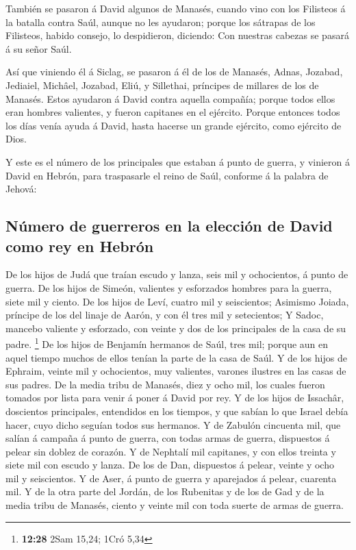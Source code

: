  También se pasaron á David algunos de Manasés, cuando vino
con los Filisteos á la batalla contra Saúl, aunque no les ayudaron;
porque los sátrapas de los Filisteos, habido consejo, lo despidieron,
diciendo: Con nuestras cabezas se pasará á su señor Saúl.

 Así que viniendo él á Siclag, se pasaron á él de los de
Manasés, Adnas, Jozabad, Jediaiel, Michâel, Jozabad, Eliú, y Sillethai,
príncipes de millares de los de Manasés.  Estos ayudaron á
David contra aquella compañía; porque todos ellos eran hombres
valientes, y fueron capitanes en el ejército.  Porque
entonces todos los días venía ayuda á David, hasta hacerse un grande
ejército, como ejército de Dios.

 Y este es el número de los principales que estaban á punto
de guerra, y vinieron á David en Hebrón, para traspasarle el reino de
Saúl, conforme á la palabra de Jehová:

\hypertarget{nuxfamero-de-guerreros-en-la-elecciuxf3n-de-david-como-rey-en-hebruxf3n}{%
\subsection{Número de guerreros en la elección de David como rey en
Hebrón}\label{nuxfamero-de-guerreros-en-la-elecciuxf3n-de-david-como-rey-en-hebruxf3n}}

 De los hijos de Judá que traían escudo y lanza, seis mil y
ochocientos, á punto de guerra.  De los hijos de Simeón,
valientes y esforzados hombres para la guerra, siete mil y ciento.
 De los hijos de Leví, cuatro mil y seiscientos;
 Asimismo Joiada, príncipe de los del linaje de Aarón, y
con él tres mil y setecientos;  Y Sadoc, mancebo valiente y
esforzado, con veinte y dos de los principales de la casa de su padre.
\footnote{\textbf{12:28} 2Sam 15,24; 1Cró 5,34}  De los
hijos de Benjamín hermanos de Saúl, tres mil; porque aun en aquel tiempo
muchos de ellos tenían la parte de la casa de Saúl.  Y de
los hijos de Ephraim, veinte mil y ochocientos, muy valientes, varones
ilustres en las casas de sus padres.  De la media tribu de
Manasés, diez y ocho mil, los cuales fueron tomados por lista para venir
á poner á David por rey.  Y de los hijos de Issachâr,
doscientos principales, entendidos en los tiempos, y que sabían lo que
Israel debía hacer, cuyo dicho seguían todos sus hermanos. 
Y de Zabulón cincuenta mil, que salían á campaña á punto de guerra, con
todas armas de guerra, dispuestos á pelear sin doblez de corazón.
 Y de Nephtalí mil capitanes, y con ellos treinta y siete
mil con escudo y lanza.  De los de Dan, dispuestos á
pelear, veinte y ocho mil y seiscientos.  Y de Aser, á
punto de guerra y aparejados á pelear, cuarenta mil.  Y de
la otra parte del Jordán, de los Rubenitas y de los de Gad y de la media
tribu de Manasés, ciento y veinte mil con toda suerte de armas de
guerra.

